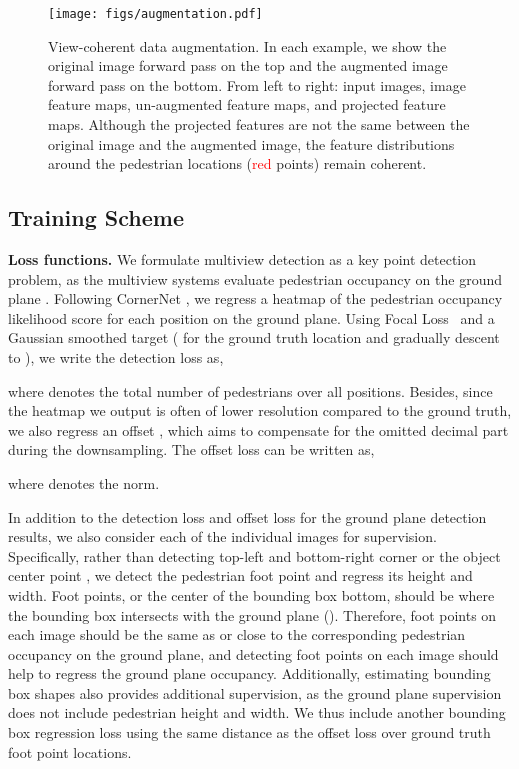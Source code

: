 \documentclass[sigconf,authorversion,nonacm]{acmart}
\begin{document}
\begin{figure*}[h]
  \centering
  \texttt{[image: figs/augmentation.pdf]}
  \caption{
  View-coherent data augmentation. In each example, we show the original image forward pass on the top and the augmented image forward pass on the bottom. From left to right: input images, image feature maps, un-augmented feature maps, and projected feature maps. Although the projected features are not the same between the original image and the augmented image, the feature distributions around the pedestrian locations (\textcolor{red}{red} points) remain coherent. 
  }
  \label{fig:aug}
\end{figure*}





\subsection{Training Scheme}
\label{secsec:train}
\textbf{Loss functions.}
We formulate multiview detection as a key point detection problem, as the multiview systems evaluate pedestrian occupancy on the ground plane \cite{chavdarova2018wildtrack,hou2020multiview}. Following CornerNet \cite{law2018cornernet}, we regress a heatmap of the pedestrian occupancy likelihood score  for each position  on the ground plane. Using Focal Loss~\cite{lin2017focal} and a Gaussian smoothed target  ( for the ground truth location and gradually descent to ), we write the detection loss as,

where  denotes the total number of pedestrians over all positions. 
Besides, since the heatmap we output is often of lower resolution compared to the ground truth, we also regress an offset , which aims to compensate for the omitted decimal part  during the  downsampling. The offset loss can be written as,

where  denotes the  norm. 

In addition to the detection loss  and offset loss  for the ground plane detection results, we also consider each of the individual images for supervision. 
Specifically, rather than detecting top-left and bottom-right corner \cite{law2018cornernet,duan2019centernet,song2018small} or the object center point \cite{zhou2019objects,duan2019centernet,liu2019high}, we detect the pedestrian foot point and regress its height and width. Foot points, or the center of the bounding box bottom, should be where the bounding box intersects with the ground plane (). Therefore, foot points on each image should be the same as or close to the corresponding pedestrian occupancy on the ground plane, and detecting foot points on each image should help to regress the ground plane occupancy. Additionally, estimating bounding box shapes also provides additional supervision, as the ground plane supervision does not include pedestrian height and width. We thus include another bounding box regression loss  using the same  distance as the offset loss  over ground truth foot point locations. 
\end{document}
